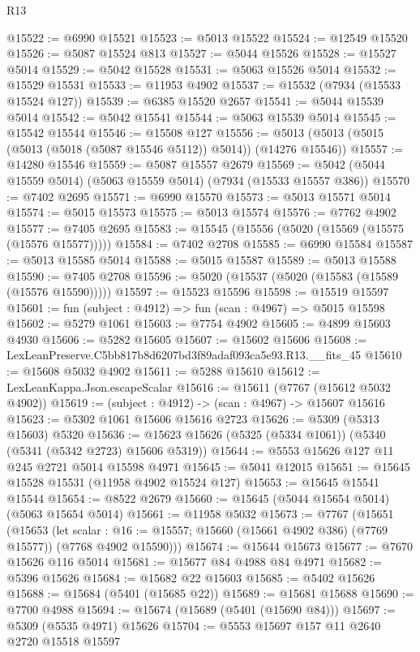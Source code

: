 \begin{lexlean}{R13}
\begin{coremodule}
@15522 := @6990 @15521
@15523 := @5013 @15522
@15524 := @12549 @15520
@15526 := @5087 @15524 @813
@15527 := @5044 @15526
@15528 := @15527 @5014
@15529 := @5042 @15528
@15531 := @5063 @15526 @5014
@15532 := @15529 @15531
@15533 := @11953 @4902
@15537 := @15532 (@7934 (@15533 @15524 @127))
@15539 := @6385 @15520 @2657
@15541 := @5044 @15539 @5014
@15542 := @5042 @15541
@15544 := @5063 @15539 @5014
@15545 := @15542 @15544
@15546 := @15508 @127
@15556 := @5013 (@5013 (@5015 (@5013 (@5018 (@5087 @15546 @5112)) @5014)) (@14276 @15546))
@15557 := @14280 @15546
@15559 := @5087 @15557 @2679
@15569 := @5042 (@5044 @15559 @5014) (@5063 @15559 @5014) (@7934 (@15533 @15557 @386))
@15570 := @7402 @2695
@15571 := @6990 @15570
@15573 := @5013 @15571 @5014
@15574 := @5015 @15573
@15575 := @5013 @15574
@15576 := @7762 @4902
@15577 := @7405 @2695
@15583 := @15545 (@15556 (@5020 (@15569 (@15575 (@15576 @15577)))))
@15584 := @7402 @2708
@15585 := @6990 @15584
@15587 := @5013 @15585 @5014
@15588 := @5015 @15587
@15589 := @5013 @15588
@15590 := @7405 @2708
@15596 := @5020 (@15537 (@5020 (@15583 (@15589 (@15576 @15590)))))
@15597 := @15523 @15596
@15598 := @15519 @15597
@15601 := fun (subject : @4912) => fun (scan : @4967) => @5015 @15598
@15602 := @5279 @1061
@15603 := @7754 @4902
@15605 := @4899 @15603 @4930
@15606 := @5282 @15605
@15607 := @15602 @15606
@15608 := LexLeanPreserve.C5bb817b8d6207bd3f89adaf093ca5e93.R13.__fits_45
@15610 := @15608 @5032 @4902
@15611 := @5288 @15610
@15612 := LexLeanKappa.Json.escapeScalar
@15616 := @15611 (@7767 (@15612 @5032 @4902))
@15619 := (subject : @4912) -> (scan : @4967) -> @15607 @15616
@15623 := @5302 @1061 @15606 @15616 @2723
@15626 := @5309 (@5313 @15603) @5320
@15636 := @15623 @15626 (@5325 (@5334 @1061)) (@5340 (@5341 (@5342 @2723) @15606 @5319))
@15644 := @5553 @15626 @127 @11 @245 @2721 @5014 @15598 @4971
@15645 := @5041 @12015
@15651 := @15645 @15528 @15531 (@11958 @4902 @15524 @127)
@15653 := @15645 @15541 @15544
@15654 := @8522 @2679
@15660 := @15645 (@5044 @15654 @5014) (@5063 @15654 @5014)
@15661 := @11958 @5032
@15673 := @7767
    (@15651
      (@15653
        (let scalar : @16 := @15557; @15660 (@15661 @4902 @386) (@7769 @15577))
        (@7768 @4902 @15590)))
@15674 := @15644 @15673
@15677 := @7670 @15626 @116 @5014
@15681 := @15677 @84 @4988 @84 @4971
@15682 := @5396 @15626
@15684 := @15682 @22 @15603
@15685 := @5402 @15626
@15688 := @15684 (@5401 (@15685 @22))
@15689 := @15681 @15688
@15690 := @7700 @4988
@15694 := @15674 (@15689 (@5401 (@15690 @84)))
@15697 := @5309 (@5535 @4971) @15626
@15704 := @5553 @15697 @157 @11 @2640 @2720 @15518 @15597

\end{coremodule}
\end{lexlean}
